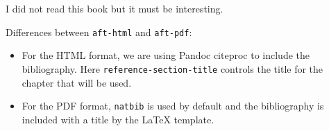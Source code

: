 \documentclass[
]{aft}
\providecommand{\tightlist}{%
  \setlength{\itemsep}{0pt}\setlength{\parskip}{0pt}}\usepackage{longtable,booktabs,array}
\begin{document}
I did not read this book \citep{CameronTrivedi2013} but it must be
interesting.

Differences between \texttt{aft-html} and \texttt{aft-pdf}:

\begin{itemize}
\tightlist
\item
  For the HTML format, we are using Pandoc citeproc to include the
  bibliography. Here \texttt{reference-section-title} controls the title
  for the chapter that will be used.
\item
  For the PDF format, \texttt{natbib} is used by default and the
  bibliography is included with a title by the LaTeX template.
\end{itemize}


  
\end{document}
